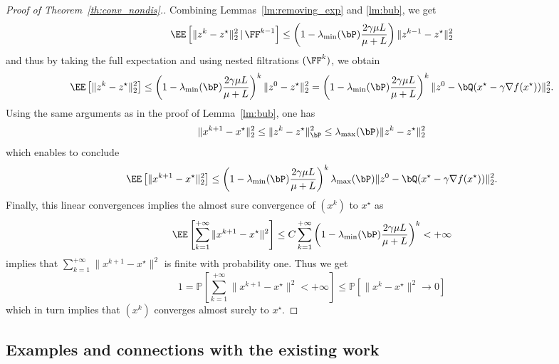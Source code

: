 \begin{proof}[Proof of Theorem~\ref{th:conv_nondis}.]
Combining Lemmas~\ref{lm:removing_exp} and \ref{lm:bub}, we get
\begin{align*}
    \EE\left[\|z^{k} - z^\star\|_2^2\,|\,\FF^{k-1}\right] \leq \left(1 - \lambda_{\min}(\bP)\frac{2\gamma\mu L}{\mu + L}\right)\|z^{k-1}-z^\star\|_2^2
\end{align*}
and thus by taking the full expectation and using nested filtrations $(\FF^k)$, we obtain
\begin{equation*}%
    \EE\left[\|z^{k} - z^\star\|_2^2\right] \leq \left(1 - \lambda_{\min}(\bP)\frac{2\gamma\mu L}{\mu + L}\right)^k\|z^0-z^\star\|_2^2 = \left(1 - \lambda_{\min}(\bP)\frac{2\gamma\mu L}{\mu + L}\right)^k\|z^0-\bQ(x^\star - \gamma\nabla f(x^\star))\|_2^2.
\end{equation*}
Using the same arguments as in the proof of Lemma~\ref{lm:bub}, one has
\begin{align*}
  \|x^{k+1}-x^\star\|_2^2 \leq  \|z^k-z^\star\|_{\bP}^2 \leq \lambda_{\max}(\bP)\|z^k-z^\star\|_2^2
\end{align*}
which enables to conclude 
\begin{equation*}
    \EE\left[\|x^{k+1}-x^\star\|_2^2\right] \leq \left(1 - \lambda_{\min}(\bP)\frac{2\gamma\mu L}{\mu + L}\right)^k \lambda_{\max}(\bP) \|z^0-\bQ(x^\star - \gamma\nabla f(x^\star))\|_2^2.
\end{equation*}
Finally, this linear convergences implies the almost sure convergence of $(x^k)$ to $x^\star$ as 
\begin{equation*}
    \EE\left[ \sum_{k=1}^{+\infty}  \|x^{k+1} - x^\star \|^2 \right]\leq C \sum_{k=1}^{+\infty}\left(1-\lambda_{\min}(\bP)\frac{2\gamma\mu L}{\mu + L}\right)^k < +\infty
\end{equation*}
implies that $ \sum_{k=1}^{+\infty}  \|x^{k+1} - x^\star \|^2$ is finite with probability one. Thus we get
\[
1 = \mathbb{P}\left[ \sum_{k=1}^{+\infty}  \|x^{k+1} - x^\star \|^2 < +\infty \right] \leq \mathbb{P}\left[ \|x^k - x^\star \|^2 \to 0 \right]
\]
which in turn implies that $(x^k)$ converges almost surely to $x^\star$.
\end{proof}

\subsection{Examples and connections with the existing work}\label{sec:comparison}
 
